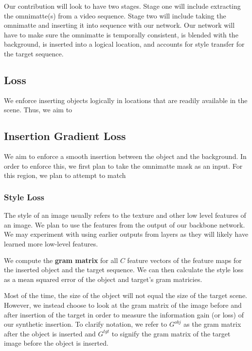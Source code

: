 \documentclass{article}
\begin{document}

Our contribution will look to have two stages. Stage one will include extracting the omnimatte(s) from a video sequence. Stage two will include taking the omnimatte and inserting it into sequence with our network. Our network will have to make sure the omnimatte is temporally consistent, is blended with the background, is inserted into a logical location, and accounts for style transfer for the target sequence.

\subsection{Loss}
We enforce inserting objects logically in locations that are readily available in the scene. Thus, we aim to

\subsection{Insertion Gradient Loss}
We aim to enforce a smooth insertion between the object and the background. In order to enforce this, we first plan to take the omnimatte mask as an input. For this region, we plan to attempt to match  

\subsubsection{Style Loss}
The style of an image usually refers to the texture and other low level features of an image. We plan to use the features from the output of our backbone network. We may experiment with using earlier outputs from layers as they will likely have learned more low-level features.

We compute the \textbf{gram matrix} for all $C$ feature vectors of the feature maps for the inserted object and the target sequence. We can then calculate the style loss as a mean squared error of the object and target's gram matricies.

Most of the time, the size of the object will not equal the size of the target scene. However, we instead choose to look at the gram matrix of the image before and after insertion of the target in order to measure the information gain (or loss) of our synthetic insertion. To clarify notation, we refer to $G^{obj}$ as the gram matrix after the object is inserted and $G^{tgt}$ to signify the gram matrix of the target image before the object is inserted.
\end{document}
